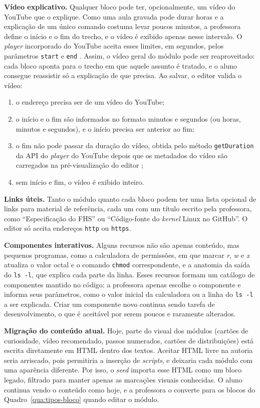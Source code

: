 \textbf{Vídeo explicativo.} Qualquer bloco pode ter, opcionalmente, um vídeo do YouTube que o explique. Como uma aula gravada pode durar horas e a explicação de um único comando costuma levar poucos minutos, a professora define o início e o fim do trecho, e o vídeo é exibido apenas nesse intervalo. O \textit{player} incorporado do YouTube aceita esses limites, em segundos, pelos parâmetros \texttt{start} e \texttt{end} \cite{youtube2026parameters}. Assim, o vídeo geral do módulo pode ser reaproveitado: cada bloco aponta para o trecho em que aquele assunto é tratado, e o aluno consegue reassistir só a explicação de que precisa. Ao salvar, o editor valida o vídeo:

\begin{enumerate}
    \item o endereço precisa ser de um vídeo do YouTube;
    \item o início e o fim são informados no formato minutos e segundos (ou horas, minutos e segundos), e o início precisa ser anterior ao fim;
    \item o fim não pode passar da duração do vídeo, obtida pelo método \texttt{getDuration} da API do \textit{player} do YouTube depois que os metadados do vídeo são carregados na pré-visualização do editor \cite{youtube2026iframe};
    \item sem início e fim, o vídeo é exibido inteiro.
\end{enumerate}

\textbf{Links úteis.} Tanto o módulo quanto cada bloco podem ter uma lista opcional de links para material de referência, cada um com um título escrito pela professora, como ``Especificação do FHS'' ou ``Código-fonte do \textit{kernel} Linux no GitHub''. O editor só aceita endereços \texttt{http} ou \texttt{https}.

\textbf{Componentes interativos.} Alguns recursos não são apenas conteúdo, mas pequenos programas, como a calculadora de permissões, em que marcar \textit{r}, \textit{w} e \textit{x} atualiza o valor octal e o comando \texttt{chmod} correspondente, e a anatomia da saída do \texttt{ls -l}, que explica cada parte da linha. Esses recursos formam um catálogo de componentes mantido no código: a professora apenas escolhe o componente e informa seus parâmetros, como o valor inicial da calculadora ou a linha do \texttt{ls -l} a ser explicada. Criar um componente novo continua sendo tarefa de desenvolvimento, o que é aceitável por serem poucos e raramente alterados.

\textbf{Migração do conteúdo atual.} Hoje, parte do visual dos módulos (cartões de curiosidade, vídeo recomendado, passos numerados, cartões de distribuições) está escrita diretamente em HTML dentro dos textos. Aceitar HTML livre na autoria seria arriscado, pois permitiria a inserção de \textit{scripts}, e deixaria cada módulo com uma aparência diferente. Por isso, o \textit{seed} importa esse HTML como um bloco legado, filtrado para manter apenas as marcações visuais conhecidas. O aluno continua vendo o conteúdo como hoje, e a professora o converte para os blocos do Quadro~\ref{qua:tipos-bloco} quando editar o módulo.


